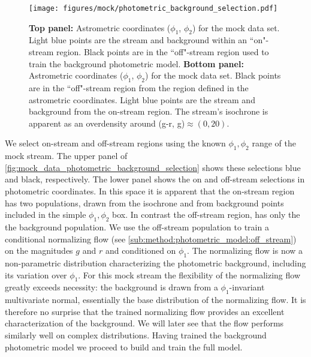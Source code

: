 \documentclass[twocolumn]{aastex631}
\begin{document}
        \begin{figure}
            \centering
            \texttt{[image: figures/mock/photometric\_background\_selection.pdf]}
            \caption{
                \textbf{Top panel:} Astrometric coordinates ($\phi_1$, $\phi_2$) for
                the mock data set.  Light blue points are the stream and background
                within an ``on"-stream region. Black points are in the ``off"-stream
                region used to train the background photometric model.
                \textbf{Bottom panel:} Astrometric coordinates ($\phi_1$, $\phi_2$)
                for the mock data set.  Black points are in the ``off"-stream region
                from the region defined in the astrometric coordinates.  Light blue
                points are the stream and background from the on-stream region. The
                stream's isochrone is apparent as an overdensity around (g-r,
                g)$\approx (0, 20)$.  }
            \label{fig:mock_data_photometric_background_selection}
        \end{figure}
    
        We select on-stream and off-stream regions using the known $\phi_1, \phi_2$
        range of the mock stream.  The upper panel of
        \autoref{fig:mock_data_photometric_background_selection} shows these
        selections blue and black, respectively.  The lower panel shows the on and
        off-stream selections in photometric coordinates.  In this space it is
        apparent that the on-stream region has two populations, drawn from the
        isochrone and from background points included in the simple $\phi_1, \phi_2$
        box.  In contrast the off-stream region, has only the the background population.
        We use the off-stream population to train a conditional normalizing flow
        (see \autoref{sub:method:photometric_model:off_stream}) on the magnitudes
        $g$ and $r$ and conditioned on $\phi_1$.  The normalizing flow is now a
        non-parametric distribution characterizing the photometric background,
        including its variation over $\phi_1$.  For this mock stream the flexibility
        of the normalizing flow greatly exceeds necessity: the background is
        drawn from a $\phi_1$-invariant multivariate normal, essentially the base
        distribution of the normalizing flow.  It is therefore no surprise that
        the trained normalizing flow provides an excellent characterization of
        the background.  We will later see that the flow performs similarly well
        on complex distributions.  Having trained the background photometric model
        we proceed to build and train the full model.
    
\end{document}
